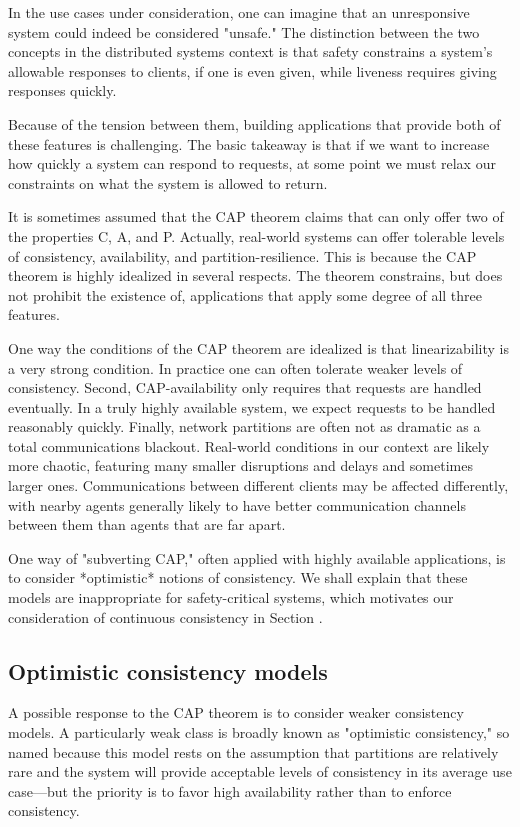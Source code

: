 In the use cases under consideration, one can imagine that an
unresponsive system could indeed be considered "unsafe." The
distinction between the two concepts in the distributed systems
context is that safety constrains a system's allowable responses to
clients, if one is even given, while liveness requires giving
responses quickly.

Because of the tension between them, building applications that
provide both of these features is challenging. The basic takeaway is
that if we want to increase how quickly a system can respond to
requests, at some point we must relax our constraints on what the
system is allowed to return.

It is sometimes assumed that the CAP theorem claims that can only
offer two of the properties C, A, and P. Actually, real-world systems
can offer tolerable levels of consistency, availability, and
partition-resilience. This is because the CAP theorem is highly
idealized in several respects. The theorem constrains, but does not
prohibit the existence of, applications that apply some degree of all
three features.

One way the conditions of the CAP theorem are idealized is that
linearizability is a very strong condition. In practice one can often
tolerate weaker levels of consistency. Second, CAP-availability only
requires that requests are handled eventually. In a truly highly
available system, we expect requests to be handled reasonably
quickly. Finally, network partitions are often not as dramatic as a
total communications blackout. Real-world conditions in our context
are likely more chaotic, featuring many smaller disruptions and delays
and sometimes larger ones. Communications between different clients
may be affected differently, with nearby agents generally likely to
have better communication channels between them than agents that are
far apart.

One way of "subverting CAP," often applied with highly available
applications, is to consider *optimistic* notions of consistency. We
shall explain that these models are inappropriate for safety-critical
systems, which motivates our consideration of continuous consistency
in Section \cite{}.

\subsection{Optimistic consistency models}

A possible response to the CAP theorem is to consider weaker
consistency models. A particularly weak class is broadly known as
"optimistic consistency," so named because this model rests on the
assumption that partitions are relatively rare and the system will
provide acceptable levels of consistency in its average use case---but
the priority is to favor high availability rather than to enforce
consistency.

